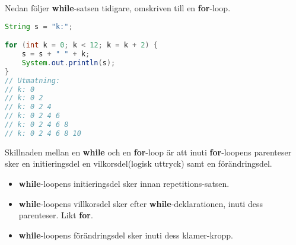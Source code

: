 \documentclass[../main.tex]{subfiles}
\begin{document}
Nedan följer \textbf{while}-satsen tidigare, omskriven till en \textbf{for}-loop.
\begin{lstlisting}[language=java]
String s = "k:";

for (int k = 0; k < 12; k = k + 2) {
    s = s + " " + k;
    System.out.println(s);
}
// Utmatning:
// k: 0
// k: 0 2
// k: 0 2 4
// k: 0 2 4 6
// k: 0 2 4 6 8
// k: 0 2 4 6 8 10
\end{lstlisting}
Skillnaden mellan en \textbf{while} och en \textbf{for}-loop är att inuti \textbf{for}-loopens parenteser sker en initieringsdel
en vilkorsdel(logisk uttryck) samt en förändringsdel.

\begin{itemize}
    \item \textbf{while}-loopens initieringsdel sker innan repetitions-satsen.
    \item \textbf{while}-loopens villkorsdel sker efter \textbf{while}-deklarationen, inuti dess parenteser. Likt \textbf{for}.
    \item \textbf{while}-loopens förändringsdel sker inuti dess klamer-kropp.
\end{itemize}
\end{document}
